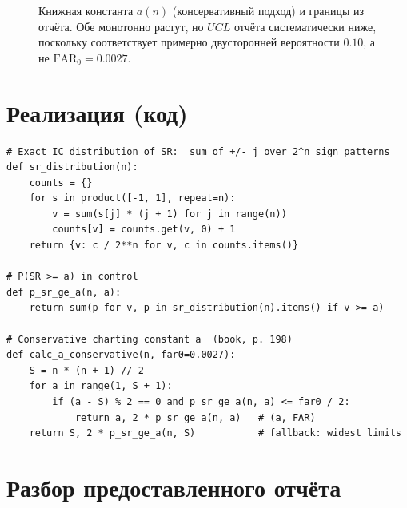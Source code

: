 \documentclass[11pt,a4paper]{article}
\newcommand{\FAR}{\mathrm{FAR}}
\newcommand{\FARz}{\FAR_0}
\def\srA{(2,3) (3,6) (4,10) (5,15) (6,21) (7,28) (8,36) (9,45) (10,55) (11,64) (12,72) (13,81) (14,91) (15,100) (16,110) (17,121) (18,133) (19,144) (20,156)}
\def\srSrc{(4,10) (5,15) (6,17) (7,20) (8,24) (9,29) (10,33) (11,38) (12,42) (13,47) (14,53) (15,58)}
\begin{document}
\begin{figure}[htbp]\centering
{}
\caption{Книжная константа $a(n)$ (консервативный подход) и границы из
отчёта. Обе монотонно растут, но $UCL$ отчёта систематически ниже,
поскольку соответствует примерно двусторонней вероятности $0.10$, а не
$\FARz=0.0027$.}
\label{fig:srn}
\end{figure}

\section{Реализация (код)}

\begin{lstlisting}
# Exact IC distribution of SR:  sum of +/- j over 2^n sign patterns
def sr_distribution(n):
    counts = {}
    for s in product([-1, 1], repeat=n):
        v = sum(s[j] * (j + 1) for j in range(n))
        counts[v] = counts.get(v, 0) + 1
    return {v: c / 2**n for v, c in counts.items()}

# P(SR >= a) in control
def p_sr_ge_a(n, a):
    return sum(p for v, p in sr_distribution(n).items() if v >= a)

# Conservative charting constant a  (book, p. 198)
def calc_a_conservative(n, far0=0.0027):
    S = n * (n + 1) // 2
    for a in range(1, S + 1):
        if (a - S) % 2 == 0 and p_sr_ge_a(n, a) <= far0 / 2:
            return a, 2 * p_sr_ge_a(n, a)   # (a, FAR)
    return S, 2 * p_sr_ge_a(n, S)           # fallback: widest limits
\end{lstlisting}

\section{Разбор предоставленного отчёта}
\end{document}
